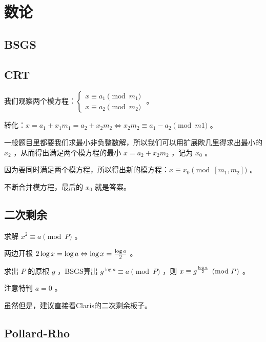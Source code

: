 \section{数论}

\subsection{BSGS}



\subsection{CRT}

我们观察两个模方程：$\begin{cases}x\equiv a_1\pmod{m_1}\\x\equiv a_2\pmod{m_2}\end{cases}$ 。

转化：$x=a_1+x_1m_1=a_2+x_2m_2\Leftrightarrow x_2m_2\equiv a_1-a_2\pmod{m1}$ 。

一般题目里都要我们求最小非负整数解，所以我们可以用扩展欧几里得求出最小的 $x_2$ ，从而得出满足两个模方程的最小 $x=a_2+x_2m_2$ ，记为 $x_0$ 。

因为要同时满足两个模方程，所以得出新的模方程：$x\equiv x_0\pmod{[m_1,m_2]}$ 。

不断合并模方程，最后的 $x_0$ 就是答案。



\newpage

\subsection{二次剩余}

求解 $x^2\equiv a\pmod{P}$ 。

两边开根 $2\log x=\log a\Leftrightarrow \log x={\log a\over 2}$ 。

求出 $P$ 的原根 $g$ ，BSGS算出 $g^{\log a}\equiv a\pmod{P}$ ，则 $x\equiv g^{\log a\over 2}\pmod{P}$ 。

注意特判 $a=0$ 。

虽然但是，建议直接看Claris的二次剩余板子。



\subsection{Pollard-Rho}

